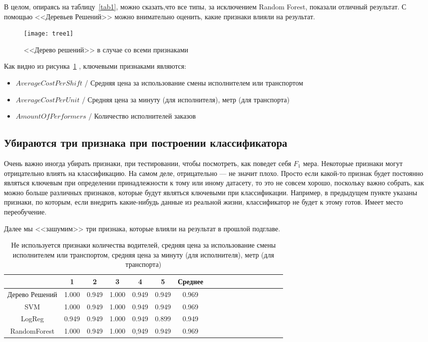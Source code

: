 В целом, опираясь на таблицу~\ref{tab1}, можно сказать,что все типы, за исключением Random Forest, показали отличный результат.
С помощью <<Деревьев Решений>> можно внимательно оценить, какие признаки влияли на результат.
\begin{figure}[h]
	\caption{<<Дерево решений>> в случае со всеми признаками \label{tree1}} \centering
	\texttt{[image: tree1]}
\end{figure}

Как видно из рисунка~\ref{tree1} , ключевыми признаками являются:
\begin{itemize}
\item $AverageCostPerShift$ / Средняя цена за использование смены исполнителем или транспортом 
\item $AverageCostPerUnit$ / Средняя цена за минуту (для исполнителя), метр (для транспорта)
\item $AmountOfPerformers$ / Количество исполнителей заказов
\end{itemize}

\subsection{Убираются три признака при построении классификатора}

Очень важно иногда убирать признаки, при тестировании, чтобы посмотреть, как поведет себя $F_1$ мера.
Некоторые признаки могут отрицательно влиять на классификацию.
На самом деле, отрицательно --- не значит плохо.
Просто если какой-то признак будет постоянно являться ключевым при определении принадлежности к тому или иному датасету, то это не совсем хорошо, поскольку важно собрать, как можно больше  различных признаков, которые будут являться ключевыми при классификации.
Например, в предыдущем пункте указаны признаки, по которым, если внедрить какие-нибудь данные из реальной жизни, классификатор не будет к этому готов.
Имеет место переобучение.

Далее мы <<зашумим>> три признака, которые влияли на результат в прошлой подглаве.

\begin{table}[!h]
	\centering
	\caption{Не используется признаки количества водителей, средняя цена за использование смены исполнителем или транспортом, средняя цена за минуту (для исполнителя), метр (для транспорта) }\label{tab2}
			\begin{tabu}{|*{18}{c|}}\hline
			                           &  1  & 2 & 3 & 4 & 5 & Среднее \\\hline
			Дерево Решений & 1.000 & 0.949 & 1.000  & 0.949 & 0.949 & 0.969 \\\hline
			SVM                    &  1.000 & 0.949 & 1.000  & 0.949 & 0.949 & 0.969 \\\hline
			LogReg              & 0.949 & 0.949 & 1.000  & 0.949 & 0.899 & 0.949  \\\hline
			RandomForest &1.000 & 0.949 & 1.000 &  0,949  & 0.949 & 0.969 \\\hline
		\end{tabu}
\end{table}

